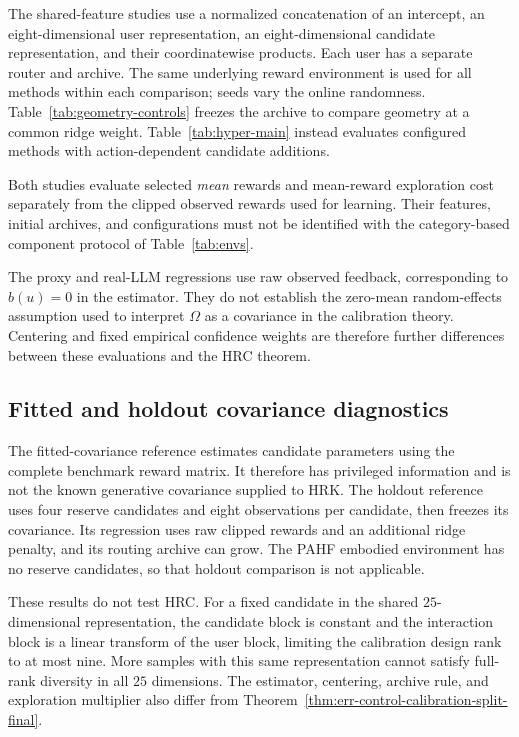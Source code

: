 \documentclass{article} %
\begin{document}
The shared-feature studies use a normalized concatenation of an intercept,
an eight-dimensional user representation, an eight-dimensional candidate
representation, and their coordinatewise products. Each user has a separate
router and archive. The same underlying reward environment is used for all
methods within each comparison; seeds vary the online randomness.
Table~\ref{tab:geometry-controls} freezes the archive to compare geometry
at a common ridge weight. Table~\ref{tab:hyper-main} instead evaluates
configured methods with action-dependent candidate additions.

Both studies evaluate selected \emph{mean} rewards and mean-reward
exploration cost separately from the clipped observed rewards used for
learning. Their features, initial archives, and configurations must not be
identified with the category-based component protocol of
Table~\ref{tab:envs}.

The proxy and real-LLM regressions use raw observed feedback, corresponding
to $b(u)=0$ in the estimator. They do not establish the zero-mean
random-effects assumption used to interpret $\Omega$ as a covariance in the
calibration theory. Centering and fixed empirical confidence weights are
therefore further differences between these evaluations and the HRC theorem.

\subsection{Fitted and holdout covariance diagnostics}

The fitted-covariance reference estimates candidate parameters using the
complete benchmark reward matrix. It therefore has privileged information
and is not the known generative covariance supplied to HRK.
The holdout reference uses four reserve candidates and eight observations
per candidate, then freezes its covariance. Its regression uses raw clipped
rewards and an additional ridge penalty, and its routing archive can grow.
The PAHF embodied environment has no reserve candidates, so that holdout
comparison is not applicable.



These results do not test HRC. For a fixed candidate in the shared
$25$-dimensional representation, the candidate block is constant and the
interaction block is a linear transform of the user block, limiting the
calibration design rank to at most nine. More samples with this same
representation cannot satisfy full-rank diversity in all $25$ dimensions.
The estimator, centering, archive rule, and exploration multiplier also
differ from Theorem~\ref{thm:err-control-calibration-split-final}.
\end{document}
